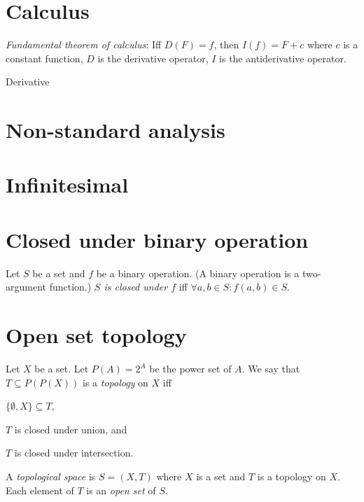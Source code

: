 \section{Calculus}

%
\emph{Fundamental theorem of calculus}:
Iff \(D(F) = f\), then \(I(f) = F + c\) where \(c\) is a constant function,
\(D\) is the derivative operator, \(I\) is the antiderivative operator.

Derivative

\section{Non-standard analysis}

\section{Infinitesimal}

\section{Closed under binary operation}

%
Let \(S\) be a set and \(f\) be a binary operation.
(A binary operation is a two-argument function.)
\emph{\(S\) is closed under \(f\)} iff
\(\forall a, b \in S : f(a,b) \in S\).

\section{Open set topology}

Let \(X\) be a set.
Let \(P(A) = 2^A\) be the power set of \(A\).
We say that \(T \subseteq P(P(X))\) is a \emph{topology} on \(X\) iff
\begin{enumerate*}[label={(\arabic*)}]
    \item \(\{ \emptyset, X \} \subseteq T\),
    \item \(T\) is closed under union, and
    \item \(T\) is closed under intersection.
\end{enumerate*}

A \emph{topological space} is \(S = (X,T)\) where \(X\) is a set and \(T\) is a topology on \(X\).
Each element of \(T\) is an \emph{open set} of \(S\).
